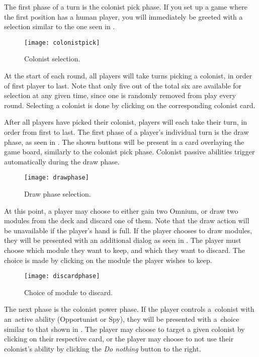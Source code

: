 The first phase of a turn is the colonist pick phase. If you set up a game where
the first position has a human player, you will immediately be greeted with a selection
similar to the one seen in .

\begin{figure}[ht]
\centerline{\mbox{\texttt{[image: colonistpick]}}}
\caption{Colonist selection.}\label{ud:colonistpick}
\end{figure}

At the start of each round, all players will take turns picking a colonist,
in order of first player to last. Note that only five out of the total
six are available for selection at any given time, since one is randomly removed
from play every round. Selecting a colonist is done by clicking on the corresponding
colonist card.

After all players have picked their colonist, players will each take their turn,
in order from first to last. The first phase of a player's individual turn is
the draw phase, as seen in . The shown buttons will be present
in a card overlaying the game board, similarly to the colonist pick phase.
Colonist passive abilities trigger automatically during the draw phase.

\begin{figure}[ht]
\centerline{\mbox{\texttt{[image: drawphase]}}}
\caption{Draw phase selection.}\label{ud:drawphase}
\end{figure}

At this point, a player may choose to either gain two Omnium, or
draw two modules from the deck and discard one of them.
Note that the draw action will be unavailable if the player's hand is full.
If the player chooses to draw modules, they will be presented with an additional
dialog as seen in . The player must choose which module they
want to keep, and which they want to discard. The choice is made by clicking on the
module the player wishes to keep.

\begin{figure}[ht]
\centerline{\mbox{\texttt{[image: discardphase]}}}
\caption{Choice of module to discard.}\label{ud:discardphase}
\end{figure}

The next phase is the colonist power phase. If the player controls a~colonist
with an~active ability (Opportunist or Spy), they will be presented with a~choice
similar to that shown in . The player may choose to target
a given colonist by clicking on their respective card, or the player may choose
to not use their colonist's ability by clicking the \emph{Do nothing} button
to the right.

